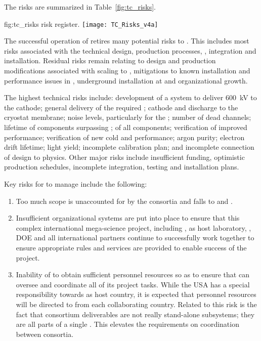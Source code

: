 The  risks are summarized in Table~\ref{fig:tc_risks}.
\begin{dunefigure}{fig:tc_risks}
  { risk register.}
  \texttt{[image: TC\_Risks\_v4a]}
\end{dunefigure}


The successful operation of  retires many
potential risks to . This includes most risks associated with the
technical design, production processes, , integration
and installation. Residual risks remain relating to design and
production modifications associated with scaling to , mitigations
to known installation and performance issues in , underground
installation at \surf and organizational growth.

The highest technical risks include: development of a system to
deliver \SI{600}{kV} to the \dual cathode; general delivery of the
required ; cathode and  discharge to the cryostat
membrane; noise levels, particularly for the ; %
number of dead channels; lifetime of components surpassing \dunelifetime{}; %
 of all components; verification of improved 
performance; verification of new cold   and   performance;
argon purity; electron drift lifetime; \phel light yield;
incomplete calibration plan; and incomplete connection of design to
physics. Other major risks include insufficient funding, optimistic
production schedules, incomplete integration, testing and installation
plans.

Key risks for  to manage include the following:
\begin{enumerate}
\item Too much scope is unaccounted for by the consortia and falls
  to  and .
\item Insufficient organizational systems are put into place to
  ensure that this complex international mega-science project,
  including , \fnal as host laboratory, \surf, DOE and all international
  partners continue to successfully work together to ensure
  appropriate rules and services are provided to enable success of
  the project.
\item Inability of  to obtain sufficient personnel resources so as to
  ensure that  can oversee and coordinate all of its
  project tasks.  While the USA has a special responsibility towards
   as host country, it is expected that personnel resources will
  be directed to  from each collaborating country. Related to this
  risk is the fact that consortium deliverables are not really
  stand-alone subsystems; they are all parts of a single . This
  elevates the requirements on coordination between consortia.
\end{enumerate}

